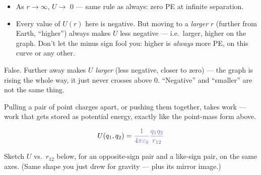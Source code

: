 \documentclass[12pt]{article}
\newcommand{\ANS}[1]{\textcolor{accent}{#1}}
\begin{document}
\begin{itemize}[itemsep=9pt,parsep=4pt,topsep=4pt]
\item As $r\to\infty$, $U\to$ \ANS{$0$} --- same rule as always: zero PE at
infinite separation.
\item Every value of $U(r)$ here is \ANS{negative}. But moving to a
\emph{larger} $r$ (further from Earth, ``higher'') always makes $U$
\ANS{less negative --- i.e.\ larger, higher on the graph}. Don't let the
minus sign fool you: higher is \emph{always} more PE, on this curve or any
other.
\end{itemize}


{\small\color{accent} False. Further away makes $U$ \emph{larger} (less
negative, closer to zero) --- the graph is rising the whole way, it just
never crosses above 0. ``Negative'' and ``smaller'' are not the same thing.}


Pulling a pair of point charges apart, or pushing them together, takes work
--- work that gets stored as potential energy, exactly like the point-mass
form above.

\[
U(q_1,q_2) = \ANS{\dfrac{1}{4\pi\varepsilon_0}\dfrac{q_1 q_2}{r_{12}}}
\]

Sketch $U$ vs.\ $r_{12}$ below, for an opposite-sign pair and a like-sign
pair, on the same axes. (Same shape you just drew for gravity --- plus its
mirror image.)

\begin{center}
\end{center}
\end{document}
